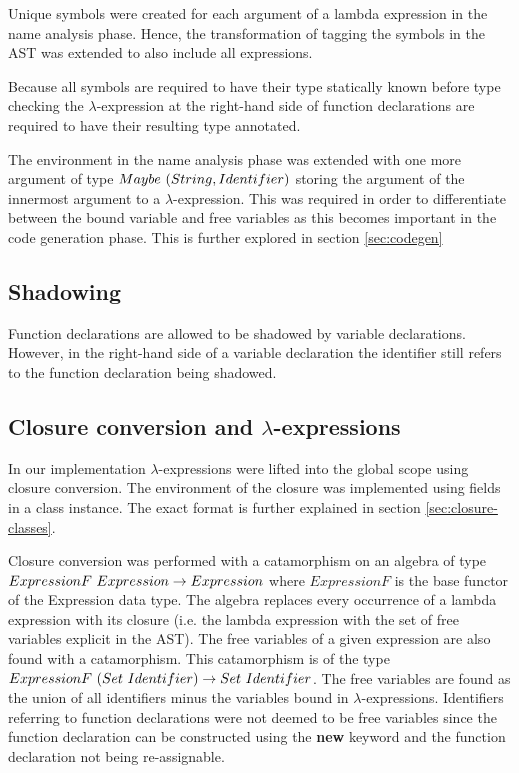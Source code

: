 Unique symbols were created for each argument of a lambda expression in the name analysis phase. Hence, the transformation of tagging the symbols in the AST was extended to also include all expressions.

Because all symbols are required to have their type statically known before type checking the $\lambda$-expression at the right-hand side of function declarations are required to have their resulting type annotated. 

The environment in the name analysis phase was extended with one more argument of type $Maybe\ (String,\\ Identifier)$ storing the argument of the innermost argument to a $\lambda$-expression. This was required in order to differentiate between the bound variable and free
variables as this becomes important in the code generation phase. This is further explored in section \ref{sec:codegen}

\subsection{Shadowing}

Function declarations are allowed to be shadowed by variable declarations. However, in the right-hand side of a variable declaration the identifier still refers to the function declaration being shadowed.

\subsection{Closure conversion and $\lambda$-expressions}\label{sec:closures}

In our implementation $\lambda$-expressions were lifted into the global scope using closure conversion. The environment of the closure was implemented using fields
in a class instance. The exact format is further explained in section \ref{sec:closure-classes}.

Closure conversion was performed with a catamorphism on an algebra of type $ExpressionF\ Expression\\ \rightarrow Expression$ where $ExpressionF$ is the base functor of the Expression data type. The algebra replaces every occurrence of a lambda expression with its closure (i.e. the lambda expression with the set of free variables explicit in the AST). The free variables of a given expression are also found with a catamorphism. This catamorphism is of the type $ExpressionF\ (\\ Set\ Identifier) \rightarrow Set\ Identifier$. The free variables are found as the union of all identifiers minus the variables bound in $\lambda$-expressions. Identifiers referring to function declarations were not deemed to be free variables since the function declaration can be constructed using the \textbf{new} keyword and the function declaration not being re-assignable.

